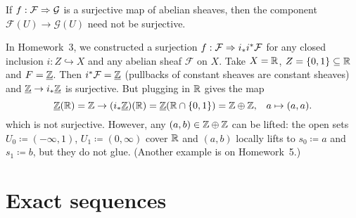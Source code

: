 
\begin{rmk}
If \(f\colon\mathcal F\To\mathcal G\) is a surjective map of abelian sheaves, then the component \(\mathcal F(U)\to\mathcal G(U)\) need not be surjective.

In Homework~3, we constructed a surjection \(f\colon\mathcal F\To i_*i^*\mathcal F\) for any closed inclusion \(i\colon Z\hookrightarrow X\) and any abelian sheaf \(\mathcal F\) on \(X\).
Take \(X=\mathbb{R}\), \(Z = \{0,1\}\subseteq\mathbb{R}\) and \(F=\underline{\mathbb{Z}}\).
Then \(i^*\mathcal F = \underline{\mathbb{Z}}\) (pullbacks of constant sheaves are constant sheaves) and \(\underline{\mathbb{Z}}\to i_*\underline{\mathbb{Z}}\) is surjective.
But plugging in \(\mathbb{R}\) gives the map
\[\underline{\mathbb{Z}}(\mathbb{R}) = \mathbb{Z} \to (i_*\underline{\mathbb{Z}})(\mathbb{R}) = \underline{\mathbb{Z}}(\mathbb{R}\cap\{0,1\}) = \mathbb{Z}\oplus\mathbb{Z}\text{,} \quad a \mapsto (a,a)\text{.} \]
which is not surjective.
However, any \((a,b)\in\mathbb{Z}\oplus\mathbb{Z}\) can be lifted: the open sets \(U_0\coloneq(-\infty,1)\), \(U_1\coloneq(0,\infty)\) cover \(\mathbb{R}\) and \((a,b)\) locally lifts to \(s_0\coloneq a\) and \(s_1\coloneq b\), but they do not glue.
(Another example is on Homework~5.)
\end{rmk}

\section{Exact sequences}

